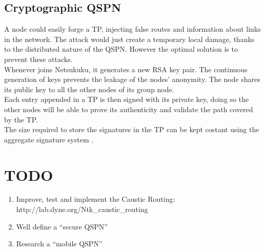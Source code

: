 \documentclass[a4paper]{article}
\newcommand{\href}[2]{ #1 }
\begin{document}
\subsection{Cryptographic QSPN}
A node could easily forge a TP, injecting false routes and information about links
in the network. The attack would just create a temporary local damage,
thanks to the distributed nature of the QSPN. However the optimal solution is
to prevent these attacks.\\

Whenever joins Netsukuku, it generates a new RSA key pair. The
continuous generation of keys prevents the leakage of the nodes' anonymity.
The node shares its public key to all the other nodes of its group node.\\
Each entry appended in a TP is then signed with its private key, doing so the
other nodes will be able to prove its authenticity and validate the path
covered by the TP.\\

The size required to store the signatures in the TP can be kept costant using the
aggregate signature system \cite{aggrsign1} \cite{aggrsign2}.

\section{TODO}
\begin{enumerate}
	\item Improve, test and implement the Caustic Routing:
		\href{http://lab.dyne.org/Ntk\_caustic\_routing}{RFC 0013}
	\item Well define a ``secure QSPN''
	\item Research a ``mobile QSPN''
\end{enumerate}
\end{document}
